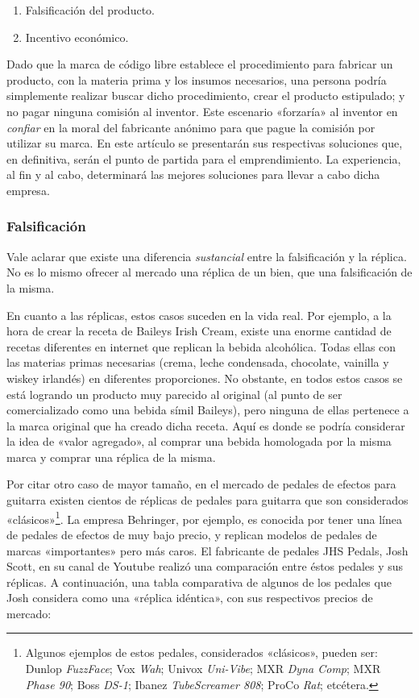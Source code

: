 \documentclass[12pt,a4paper]{article}
\begin{document}
\begin{enumerate}
\item Falsificación del producto.
\item Incentivo económico.
\end{enumerate}

Dado que la marca de código libre establece el procedimiento para fabricar un producto, con la materia prima y los insumos necesarios, una persona podría simplemente realizar buscar dicho procedimiento, crear el producto estipulado; y no pagar ninguna comisión al inventor. Este escenario «forzaría» al inventor en \textit{confiar} en la moral del fabricante anónimo para que pague la comisión por utilizar su marca. En este artículo se presentarán sus respectivas soluciones que, en definitiva, serán el punto de partida para el emprendimiento. La experiencia, al fin y al cabo, determinará las mejores soluciones para llevar a cabo dicha empresa.

\subsubsection{Falsificación}
Vale aclarar que existe una diferencia \textit{sustancial} entre la falsificación y la réplica. No es lo mismo ofrecer al mercado una réplica de un bien, que una falsificación de la misma.

En cuanto a las réplicas, estos casos suceden en la vida real. Por ejemplo, a la hora de crear la receta de Baileys Irish Cream, existe una enorme cantidad de recetas diferentes en internet que replican la bebida alcohólica. Todas ellas con las materias primas necesarias (crema, leche condensada, chocolate, vainilla y wiskey irlandés) en diferentes proporciones. No obstante, en todos estos casos se está logrando un producto muy parecido al original (al punto de ser comercializado como una bebida símil Baileys), pero ninguna de ellas pertenece a la marca original que ha creado dicha receta. Aquí es donde se podría considerar la idea de «valor agregado», al comprar una bebida homologada por la misma marca y comprar una réplica de la misma.

Por citar otro caso de mayor tamaño, en el mercado de pedales de efectos para guitarra existen cientos de réplicas de pedales para guitarra que son considerados «clásicos»\footnote{Algunos ejemplos de estos pedales, considerados «clásicos», pueden ser: Dunlop \textit{FuzzFace}; Vox \textit{Wah}; Univox \textit{Uni-Vibe}; MXR \textit{Dyna Comp}; MXR \textit{Phase 90}; Boss \textit{DS-1}; Ibanez \textit{TubeScreamer 808}; ProCo \textit{Rat}; etcétera.}. La empresa Behringer, por ejemplo, es conocida por tener una línea de pedales de efectos de muy bajo precio, y replican modelos de pedales de marcas «importantes» pero más caros. El fabricante de pedales JHS Pedals, Josh Scott, en su canal de Youtube realizó una comparación entre éstos pedales y sus réplicas. A continuación, una tabla comparativa de algunos de los pedales que Josh considera como una «réplica idéntica», con sus respectivos precios de mercado:
\end{document}
